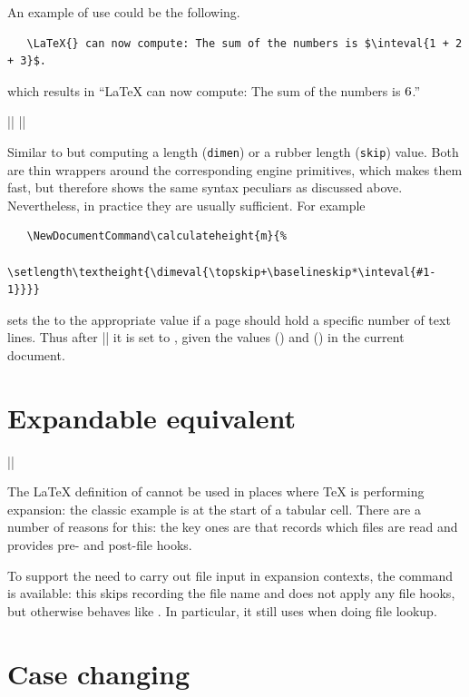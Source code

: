 \documentclass{ltxguide}
\begin{document}
An example of use could be the following.
\begin{verbatim}
   \LaTeX{} can now compute: The sum of the numbers is $\inteval{1 + 2 + 3}$.
\end{verbatim}
which results in
\enquote{\LaTeX{} can now compute: The sum of the numbers is $\inteval{1 + 2 + 3}$.}


\begin{decl}
  |\dimeval|  \qquad
  |\skipeval| 
\end{decl}

Similar to  but computing a length (\texttt{dimen}) or a
rubber length (\texttt{skip}) value. Both are thin wrappers around
the corresponding engine primitives, which makes them fast, but
therefore shows the same syntax peculiars as discussed
above. Nevertheless, in practice they are usually sufficient.  For
example
\begin{verbatim}
   \NewDocumentCommand\calculateheight{m}{%
     \setlength\textheight{\dimeval{\topskip+\baselineskip*\inteval{#1-1}}}}
\end{verbatim}
sets the  to the appropriate value if a page should
hold a specific number of text lines. Thus after ||
it is set to , given
the values  (\dimeval{\topskip}) and 
(\dimeval{\baselineskip}) in the current document.

\section{Expandable  equivalent}

\begin{decl}
  |\expandableinput| 
\end{decl}
The \LaTeX{} definition of  cannot be used in places where \TeX{} is
performing expansion: the classic example is at the start of a tabular cell.
There are a number of reasons for this: the key ones are that 
records which files are read and provides pre- and post-file hooks.

To support the need to carry out file input in expansion contexts, the command
 is available: this skips recording the file name and does
not apply any file hooks, but otherwise behaves like . In particular,
it still uses  when doing file lookup.

\section{Case changing}
\end{document}
